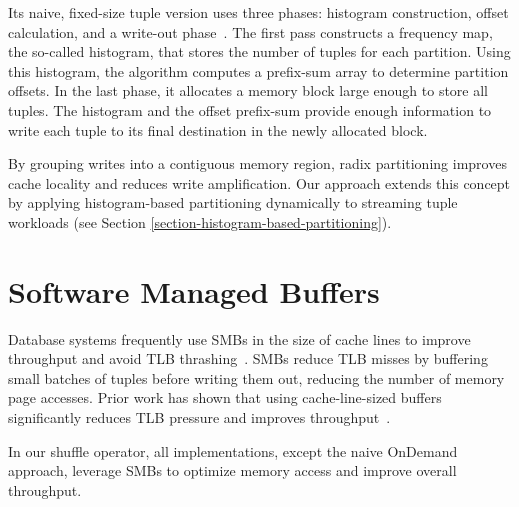Its naive, fixed-size tuple version uses three phases: histogram construction, offset calculation, and a write-out phase~\parencite{radix-partitioning-case}.
The first pass constructs a frequency map, the so-called histogram, that stores the number of tuples for each partition.
Using this histogram, the algorithm computes a prefix-sum array to determine partition offsets.
In the last phase, it allocates a memory block large enough to store all tuples.
The histogram and the offset prefix-sum provide enough information to write each tuple to its final destination in the newly allocated block.

By grouping writes into a contiguous memory region, radix partitioning improves cache locality and reduces write amplification.
Our approach extends this concept by applying histogram-based partitioning dynamically to streaming tuple workloads (see Section \ref{section-histogram-based-partitioning}).

\section{Software Managed Buffers}\label{sec-rw-smb}
Database systems frequently use \acp{SMB} in the size of cache lines to improve throughput and avoid \ac{TLB} thrashing~\parencite{db-buffer-management, smb-join, smb-partitioning-sort}.
SMBs reduce \ac{TLB} misses by buffering small batches of tuples before writing them out, reducing the number of memory page accesses.
Prior work has shown that using cache-line-sized buffers significantly reduces TLB pressure and improves throughput~\parencite{what-every-programmer-should-know-about-memory}.

In our shuffle operator, all implementations, except the naive OnDemand approach, leverage SMBs to optimize memory access and improve overall throughput.
